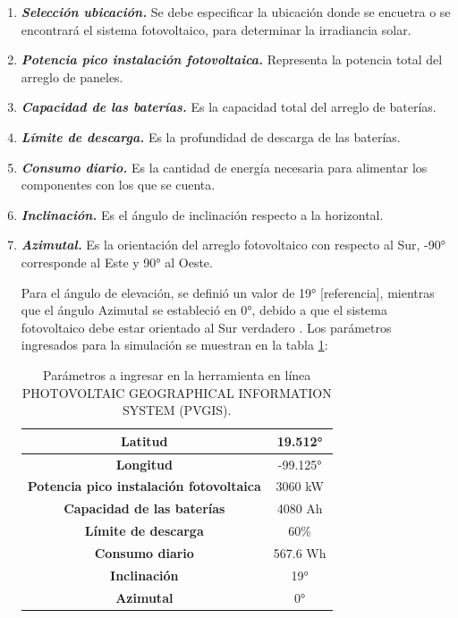 \begin{itemize}
	\begin{enumerate}
		\item \textbf{\textit{Selección ubicación.}} Se debe especificar la ubicación donde se encuetra o se encontrará el sistema fotovoltaico, para determinar la irradiancia solar. 
		\item \textbf{\textit{Potencia pico instalación fotovoltaica.}} Representa la potencia total del arreglo de paneles.
		\item \textbf{\textit{Capacidad de las baterías.}} Es la capacidad total del arreglo de baterías.
		\item \textbf{\textit{Límite de descarga.}} Es la profundidad de descarga de las baterías.
		\item \textbf{\textit{Consumo diario.}} Es la cantidad de energía necesaria para alimentar los componentes con los que se cuenta.
		\item \textbf{\textit{Inclinación.}} Es el ángulo de inclinación respecto a la horizontal. 
		\item \textbf{\textit{Azimutal.}}  Es la orientación del arreglo fotovoltaico con respecto al Sur, -90° corresponde al Este y 90° al Oeste.
		
		Para el ángulo de elevación, se definió un valor de 19° [referencia],  mientras que el ángulo Azimutal se estableció en 0°, debido a que el sistema fotovoltaico debe estar orientado al Sur verdadero \cite{DDE8}.
		Los parámetros ingresados para la simulación se muestran en la tabla \ref{tab:parametrosPVGIS}:
		\begin{table}[H]
			\centering
			\caption{Parámetros a ingresar en la herramienta en línea PHOTOVOLTAIC GEOGRAPHICAL INFORMATION SYSTEM (PVGIS).}
			\begin{tabular}{|c|c|}
				\hline
				\textbf{Latitud} & 19.512° \\
				\hline
				\textbf{Longitud} & -99.125° \\
				\hline
				\multicolumn{1}{|p{12.145em}|}{\textbf{Potencia pico instalación fotovoltaica}} & 3060 kW \\
				\hline
				\textbf{Capacidad de las baterías} & 4080 Ah \\
				\hline
				\textbf{Límite de descarga} & 60\% \\
				\hline
				\textbf{Consumo diario} & 567.6 Wh \\
				\hline
				\textbf{Inclinación} & 19° \\
				\hline
				\textbf{Azimutal} & 0° \\
				\hline
			\end{tabular}%
			\label{tab:parametrosPVGIS}%
		\end{table}%
	\end{enumerate}
	

\end{itemize}
